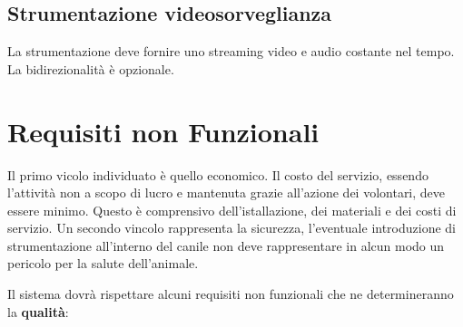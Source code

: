     \subsection{Strumentazione videosorveglianza}
        La strumentazione deve fornire uno streaming video e audio costante nel tempo. La bidirezionalità è opzionale.
        
	\section{Requisiti non Funzionali}
	Il primo vicolo individuato è quello economico. Il costo del servizio, essendo l'attività non a scopo di lucro e mantenuta grazie all'azione dei volontari, deve essere minimo. Questo è comprensivo dell'istallazione, dei materiali e dei costi di servizio.
	Un secondo vincolo rappresenta la sicurezza, l'eventuale introduzione di strumentazione all'interno del canile non deve rappresentare in alcun modo un pericolo per la salute dell'animale.
	
    Il sistema dovrà rispettare alcuni requisiti non funzionali che ne determineranno la \textbf{qualità}:
